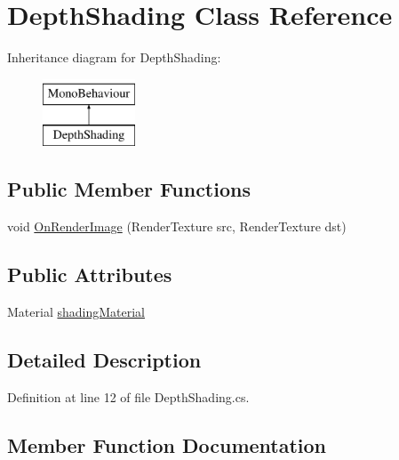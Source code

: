 \hypertarget{class_depth_shading}{}\section{Depth\+Shading Class Reference}
\label{class_depth_shading}
Inheritance diagram for Depth\+Shading\+:\begin{figure}[H]
\begin{center}
\leavevmode
\includegraphics[height=2.000000cm]{class_depth_shading}
\end{center}
\end{figure}
\subsection*{Public Member Functions}
\begin{DoxyCompactItemize}
\item 
void \hyperlink{class_depth_shading_acda5c1771b557e3f03ebd2f48e3fa0b0}{On\+Render\+Image} (Render\+Texture src, Render\+Texture dst)
\end{DoxyCompactItemize}
\subsection*{Public Attributes}
\begin{DoxyCompactItemize}
\item 
Material \hyperlink{class_depth_shading_ad5a4c8a9d7f6327252b4bcc769d248da}{shading\+Material}
\end{DoxyCompactItemize}


\subsection{Detailed Description}


Definition at line 12 of file Depth\+Shading.\+cs.



\subsection{Member Function Documentation}
\mbox{\label{class_depth_shading_acda5c1771b557e3f03ebd2f48e3fa0b0}} 
